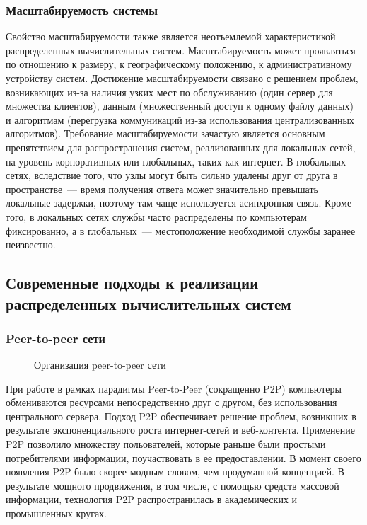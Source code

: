 \subsubsection{Масштабируемость системы}
Свойство масштабируемости также является неотъемлемой характеристикой распределенных вычислительных систем. Масштабируемость может проявляться по отношению к размеру, к географическому положению, к административному устройству систем. Достижение масштабируемости связано с решением проблем, возникающих из-за наличия узких мест по обслуживанию (один сервер для множества клиентов), данным (множественный доступ к одному файлу данных) и алгоритмам (перегрузка коммуникаций из-за использования централизованных алгоритмов). Требование масштабируемости зачастую является основным препятствием для распространения систем, реализованных для локальных сетей, на уровень корпоративных или глобальных, таких как интернет. В глобальных сетях, вследствие того, что узлы могут быть сильно удалены друг от друга в пространстве~--- время получения ответа может значительно превышать локальные задержки, поэтому там чаще используется асинхронная связь. Кроме того, в локальных сетях службы часто распределены по компьютерам фиксированно, а в глобальных~--- местоположение необходимой службы заранее неизвестно.

\subsection{Современные подходы к реализации распределенных вычислительных систем}
\subsubsection{Peer-to-peer сети}
\begin{figure}[h]
\caption{Организация peer-to-peer сети}
\label{0:peer}
\end{figure}

При работе в рамках парадигмы Peer-to-Peer (сокращенно P2P) компьютеры обмениваются ресурсами непосредственно друг с другом, без использования центрального сервера. Подход P2P обеспечивает решение проблем, возникших в результате экспоненциального роста интернет-сетей и веб-контента. Применение P2P позволило множеству польователей, которые раньше были простыми потребителями информации, поучаствовать в ее предоставлении. В момент своего появления P2P было скорее модным словом, чем продуманной концепцией. В результате мощного продвижения, в том числе, с помощью средств массовой информации, технология P2P распространилась в академических и промышленных кругах.

